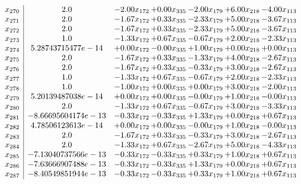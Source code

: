 \documentclass[8pt]{article}
\begin{document}
\[\begin{array}{c| c c@{\hskip 2pt} c@{\hskip 2pt} c@{\hskip 2pt} c@{\hskip 2pt} c@{\hskip 2pt} }
 x_{270}   &  2.0 & -2.00 x_{172} & +  0.00 x_{335} & -2.00 x_{179} & +  6.00 x_{218} & -4.00 x_{113}\\
 x_{271}   &  2.0 & -1.67 x_{172} & +  0.33 x_{335} & -2.33 x_{179} & +  5.00 x_{218} & -3.67 x_{113}\\
 x_{272}   &  2.0 & -1.67 x_{172} & +  0.33 x_{335} & -2.33 x_{179} & +  5.00 x_{218} & -3.67 x_{113}\\
 x_{273}   &  1.0 & -1.33 x_{172} & +  0.67 x_{335} & -0.67 x_{179} & +  2.00 x_{218} & -2.33 x_{113}\\
 x_{274}   &  5.28743715477e-14 & +  0.00 x_{172} & -0.00 x_{335} & +  1.00 x_{179} & +  0.00 x_{218} & +  0.00 x_{113}\\
 x_{275}   &  2.0 & -1.67 x_{172} & +  0.33 x_{335} & -1.33 x_{179} & +  4.00 x_{218} & -2.67 x_{113}\\
 x_{276}   &  2.0 & -1.67 x_{172} & +  0.33 x_{335} & -0.33 x_{179} & +  3.00 x_{218} & -2.67 x_{113}\\
 x_{277}   &  1.0 & -1.33 x_{172} & +  0.67 x_{335} & -0.67 x_{179} & +  2.00 x_{218} & -2.33 x_{113}\\
 x_{278}   &  1.0 & -1.00 x_{172} & +  0.00 x_{335} & +  0.00 x_{179} & +  3.00 x_{218} & -2.00 x_{113}\\
 x_{279}   &  5.20139487038e-14 & +  0.00 x_{172} & +  0.00 x_{335} & -0.00 x_{179} & +  1.00 x_{218} & -0.00 x_{113}\\
 x_{280}   &  2.0 & -1.33 x_{172} & +  0.67 x_{335} & -0.67 x_{179} & +  3.00 x_{218} & -3.33 x_{113}\\
 x_{281}   &  -8.66695604174e-13 & -0.33 x_{172} & -0.33 x_{335} & +  1.33 x_{179} & +  0.00 x_{218} & +  0.67 x_{113}\\
 x_{282}   &  4.78506123613e-14 & +  0.00 x_{172} & +  0.00 x_{335} & -0.00 x_{179} & +  1.00 x_{218} & -0.00 x_{113}\\
 x_{283}   &  2.0 & -1.67 x_{172} & +  0.33 x_{335} & -0.33 x_{179} & +  3.00 x_{218} & -2.67 x_{113}\\
 x_{284}   &  2.0 & -1.33 x_{172} & +  0.67 x_{335} & -2.67 x_{179} & +  5.00 x_{218} & -4.33 x_{113}\\
 x_{285}   &  -7.13040737566e-13 & -0.33 x_{172} & -0.33 x_{335} & +  0.33 x_{179} & +  1.00 x_{218} & +  0.67 x_{113}\\
 x_{286}   &  -7.63666907488e-13 & -0.33 x_{172} & -0.33 x_{335} & +  1.33 x_{179} & +  0.00 x_{218} & +  0.67 x_{113}\\
 x_{287}   &  -8.40549851944e-13 & -0.33 x_{172} & -0.33 x_{335} & +  0.33 x_{179} & +  1.00 x_{218} & +  0.67 x_{113}\\

\end{array}\]
\end{document}
